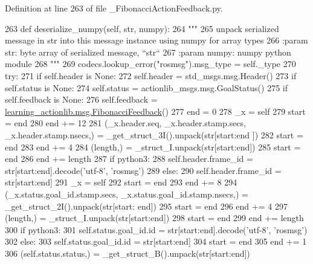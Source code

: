 Definition at line 263 of file \+\_\+\+Fibonacci\+Action\+Feedback.\+py.


\begin{DoxyCode}
263   \textcolor{keyword}{def }deserialize\_numpy(self, str, numpy):
264     \textcolor{stringliteral}{"""}
265 \textcolor{stringliteral}{    unpack serialized message in str into this message instance using numpy for array types}
266 \textcolor{stringliteral}{    :param str: byte array of serialized message, ``str``}
267 \textcolor{stringliteral}{    :param numpy: numpy python module}
268 \textcolor{stringliteral}{    """}
269     codecs.lookup\_error(\textcolor{stringliteral}{"rosmsg"}).msg\_type = self.\_type
270     \textcolor{keywordflow}{try}:
271       \textcolor{keywordflow}{if} self.header \textcolor{keywordflow}{is} \textcolor{keywordtype}{None}:
272         self.header = std\_msgs.msg.Header()
273       \textcolor{keywordflow}{if} self.status \textcolor{keywordflow}{is} \textcolor{keywordtype}{None}:
274         self.status = actionlib\_msgs.msg.GoalStatus()
275       \textcolor{keywordflow}{if} self.feedback \textcolor{keywordflow}{is} \textcolor{keywordtype}{None}:
276         self.feedback = \hyperlink{classlearning__actionlib_1_1msg_1_1__FibonacciFeedback_1_1FibonacciFeedback}{learning\_actionlib.msg.FibonacciFeedback}()
277       end = 0
278       \_x = self
279       start = end
280       end += 12
281       (\_x.header.seq, \_x.header.stamp.secs, \_x.header.stamp.nsecs,) = \_get\_struct\_3I().unpack(str[start:end
      ])
282       start = end
283       end += 4
284       (length,) = \_struct\_I.unpack(str[start:end])
285       start = end
286       end += length
287       \textcolor{keywordflow}{if} python3:
288         self.header.frame\_id = str[start:end].decode(\textcolor{stringliteral}{'utf-8'}, \textcolor{stringliteral}{'rosmsg'})
289       \textcolor{keywordflow}{else}:
290         self.header.frame\_id = str[start:end]
291       \_x = self
292       start = end
293       end += 8
294       (\_x.status.goal\_id.stamp.secs, \_x.status.goal\_id.stamp.nsecs,) = \_get\_struct\_2I().unpack(str[start:
      end])
295       start = end
296       end += 4
297       (length,) = \_struct\_I.unpack(str[start:end])
298       start = end
299       end += length
300       \textcolor{keywordflow}{if} python3:
301         self.status.goal\_id.id = str[start:end].decode(\textcolor{stringliteral}{'utf-8'}, \textcolor{stringliteral}{'rosmsg'})
302       \textcolor{keywordflow}{else}:
303         self.status.goal\_id.id = str[start:end]
304       start = end
305       end += 1
306       (self.status.status,) = \_get\_struct\_B().unpack(str[start:end])

\end{DoxyCode}
